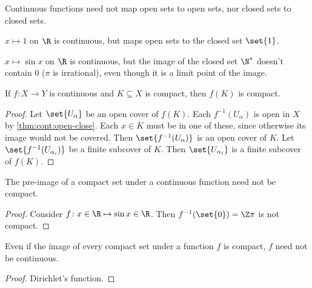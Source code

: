 \begin{remark}
    Continuous functions need not map open sets to open sets,
    nor closed sets to closed sets.

    $x \mapsto 1$ on $\R$ is continuous, but maps open sets to the closed
    set $\set{1}$.

    $x \mapsto \sin x$ on $\R$ is continuous, but the image of the closed
    set $\N^*$ doesn't contain $0$ ($\pi$ is irrational),
    even though it is a limit point of the image.
\end{remark}

\begin{theorem}[Compactness] \label{thm:cont:open-close:compactness}
    If $f\colon X \to Y$ is continuous and $K \subseteq X$ is compact,
    then $f(K)$ is compact.
\end{theorem}
\begin{proof}
    Let $\set{U_\alpha}$ be an open cover of $f(K)$.
    Each $f^{-1}(U_\alpha)$ is open in $X$ by \cref{thm:cont:open-close}.
    Each $x \in K$ must be in one of these, since otherwise its image
    would not be covered.
    Then $\set{f^{-1}(U_\alpha)}$ is an open cover of $K$.
    Let $\set{f^{-1}(U_{\alpha_i})}$ be a finite subcover of $K$.
    Then $\set{U_{\alpha_i}}$ is a finite subcover of $f(K)$.
\end{proof}
\begin{remarks}
    \item The pre-image of a compact set under a continuous function need
    not be compact.
    \begin{proof}
        Consider $f\colon x \in \R \mapsto \sin x \in \R$.
        Then $f^{-1}(\set{0}) = \Z\pi$ is not compact.
    \end{proof}
    \item Even if the image of every compact set under a function $f$ is
    compact, $f$ need not be continuous.
    \begin{proof}
        Dirichlet's function.
    \end{proof}
\end{remarks}
